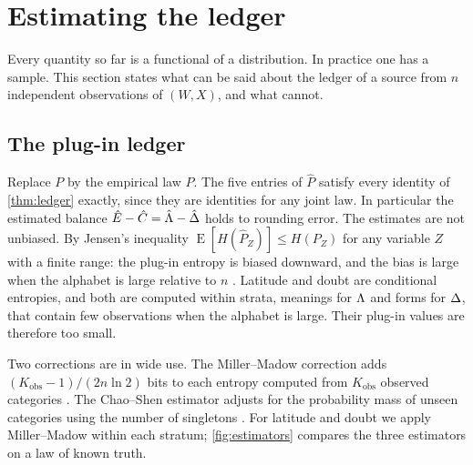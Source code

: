 \section{Estimating the ledger}\label{sec:estimation}
Every quantity so far is a functional of a distribution. In practice one has a sample. This section states what can be said about the ledger of a source from $n$ independent observations of $(W,X)$, and what cannot.

\subsection{The plug-in ledger}
Replace $P$ by the empirical law $\hat P$. The five entries of $\hat P$ satisfy every identity of \cref{thm:ledger} exactly, since they are identities for any joint law. In particular the estimated balance $\hat E-\hat C=\hat{\Lambda}-\hat{\Delta}$ holds to rounding error. The estimates are not unbiased. By Jensen's inequality $\operatorname{E}[H(\hat P_Z)]\le H(P_Z)$ for any variable $Z$ with a finite range: the plug-in entropy is biased downward, and the bias is large when the alphabet is large relative to $n$ \citep{miller1955,paninski2003}. Latitude and doubt are conditional entropies, and both are computed within strata, meanings for $\Lambda$ and forms for $\Delta$, that contain few observations when the alphabet is large. Their plug-in values are therefore too small.

Two corrections are in wide use. The Miller--Madow correction adds $(K_{\mathrm{obs}}-1)/(2n\ln2)$ bits to each entropy computed from $K_{\mathrm{obs}}$ observed categories \citep{miller1955}. The Chao--Shen estimator adjusts for the probability mass of unseen categories using the number of singletons \citep{chao2003}. For latitude and doubt we apply Miller--Madow within each stratum; \cref{fig:estimators} compares the three estimators on a law of known truth.

